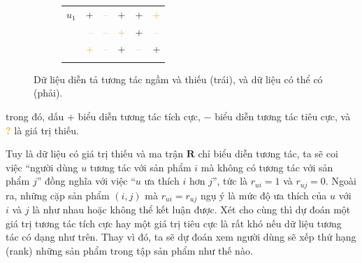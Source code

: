 \begin{figure}[H]
\begin{subfigure}[c]{0.4\textwidth}
{\begin{tabular}{cc|c|c|c|c|}
                \multicolumn{1}{c||}{$u_1$} & \multicolumn{1}{r|}{+} & \textcolor{orange}{--} & + & + & \textcolor{orange}{+} \\
                \hhline{-||-----}
                \multicolumn{1}{c||}{$u_2$} & \multicolumn{1}{r|}{\textcolor{orange}{--}} & \textcolor{orange}{--} & \textcolor{orange}{+} & + & \textcolor{orange}{--} \\
                \hhline{-||-----}
                \multicolumn{1}{c||}{$u_3$} & \multicolumn{1}{r|}{\textcolor{orange}{+}} & \textcolor{orange}{--} & + & \textcolor{orange}{--} & + \\
                \hhline{-||-----}
            \end{tabular}
        }
    \end{subfigure}
    \caption[Dữ liệu diễn tả tương tác ngầm.]{Dữ liệu diễn tả tương tác ngầm và thiếu (trái), và dữ liệu có thể có (phải).}
    \label{subfig:interpreted-matrix}
\end{figure}

\noindent trong đó, dấu $+$ biểu diễn tương tác tích cực, $-$ biểu diễn tương tác tiêu cực, và \textcolor{orange}{\textbf{?}} là giá trị thiếu.

Tuy là dữ liệu có giá trị thiếu và ma trận $\mathbf{R}$ chỉ biểu diễn tương tác, ta sẽ coi việc ``người dùng $u$ tương tác với sản phẩm $i$ mà không có tương tác với sản phẩm $j$'' đồng nghĩa với việc ``$u$ ưa thích $i$ hơn $j$'', tức là $r_{ui} = 1$ và $r_{uj} = 0$. Ngoài ra, những cặp sản phẩm $(i, j)$ mà $r_{ui} = r_{uj}$ ngụ ý là mức độ ưa thích của $u$ với $i$ và $j$ là như nhau hoặc không thể kết luận được. Xét cho cùng thì dự đoán một giá trị tương tác tích cực hay một giá trị tiêu cực là rất khó nếu dữ liệu tương tác có dạng như trên. Thay vì đó, ta sẽ dự đoán xem người dùng sẽ xếp thứ hạng (rank) những sản phẩm trong tập sản phẩm như thế nào.

